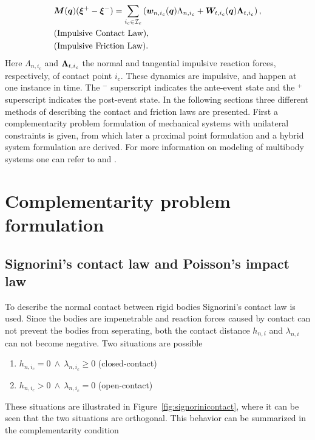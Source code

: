 \documentclass[../DC2017114Bouma.tex]{subfiles}
\begin{document}
\begin{align}
&{\boldsymbol{M}}({\boldsymbol{q}})(\boldsymbol{\xi}^+ - \boldsymbol{\xi}^-) = \sum_{i_c\in\mathcal{I}_c}\left( {\boldsymbol{w}}_{n,i_c}({\boldsymbol{q}})\Lambda_{n,i_c} + {\boldsymbol{W}}_{t,i_c}({\boldsymbol{q}})\boldsymbol{\Lambda}_{t,i_c}\right), \label{eq:appimp1}\\
&\text{(Impulsive Contact Law)},\label{eq:appimp2}\\
&\text{(Impulsive Friction Law)}.\label{eq:appimp3}
\end{align}
Here $\Lambda_{n,i_c}$ and $\boldsymbol{\Lambda}_{t,i_c}$ the normal and tangential impulsive reaction forces, respectively, of contact point $i_c$. These dynamics are impulsive, and happen at one instance in time. The $^-$ superscript indicates the ante-event state and the $^+$ superscript indicates the post-event state. In the following sections three different methods of describing the contact and friction laws are presented. First a complementarity problem formulation of mechanical systems with unilateral constraints is given, from which later a proximal point formulation and a hybrid system formulation are derived. For more information on modeling of multibody systems one can refer to \cite{Leine2008} and \cite{Wouw2016}.

\section{Complementarity problem formulation}\label{sec:comp}
\subsection{Signorini's contact law and Poisson's impact law}
To describe the normal contact between rigid bodies Signorini's contact law is used. Since the bodies are impenetrable and reaction forces caused by contact can not prevent the bodies from seperating, both the contact distance $h_{n,i}$ and $\lambda_{n,i}$ can not become negative. Two situations are possible

\begin{enumerate}
\item $h_{n,i_c}=0\ \wedge\ \lambda_{n,i_c} \geq 0$ (closed-contact)
\item $h_{n,i_c}>0\ \wedge\ \lambda_{n,i_c} = 0$ (open-contact)
\end{enumerate}

These situations are illustrated in Figure~\ref{fig:signorinicontact}, where it can be seen that the two situations are orthogonal. This behavior can be summarized in the complementarity condition
\end{document}
